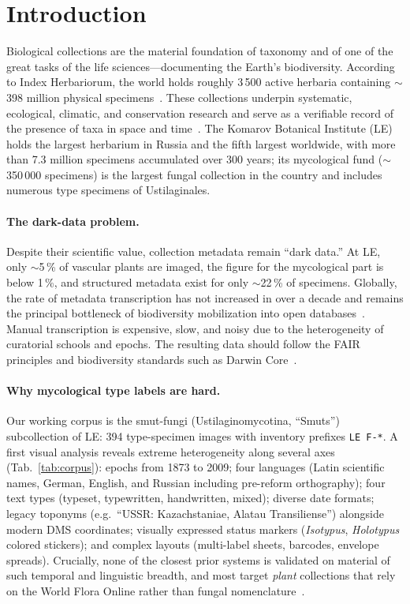 \section{Introduction}
\label{sec:intro}

Biological collections are the material foundation of taxonomy and of one of
the great tasks of the life sciences---documenting the Earth's biodiversity.
According to Index Herbariorum, the world holds roughly 3\,500 active herbaria
containing $\sim$398 million physical specimens~\cite{thiers2024ih}. These
collections underpin systematic, ecological, climatic, and conservation
research and serve as a verifiable record of the presence of taxa in space and
time~\cite{davis2023herbarium}. The Komarov Botanical Institute (LE) holds the
largest herbarium in Russia and the fifth largest worldwide, with more than
7.3 million specimens accumulated over 300 years; its mycological fund
($\sim$350\,000 specimens) is the largest fungal collection in the country and
includes numerous type specimens of Ustilaginales.

\paragraph{The dark-data problem.}
Despite their scientific value, collection metadata remain ``dark data.'' At
LE, only $\sim$5\,\% of vascular plants are imaged, the figure for the
mycological part is below 1\,\%, and structured metadata exist for only
$\sim$22\,\% of specimens. Globally, the rate of metadata transcription has not
increased in over a decade and remains the principal bottleneck of
biodiversity mobilization into open databases~\cite{owen2020nlp}. Manual
transcription is expensive, slow, and noisy due to the heterogeneity of
curatorial schools and epochs. The resulting data should follow the FAIR
principles and biodiversity standards such as Darwin
Core~\cite{wieczorek2012dwc}.

\paragraph{Why mycological type labels are hard.}
Our working corpus is the smut-fungi (Ustilaginomycotina, ``Smuts'')
subcollection of LE: 394 type-specimen images with inventory prefixes
\texttt{LE~F-*}. A first visual analysis reveals extreme heterogeneity along
several axes (Tab.~\ref{tab:corpus}): epochs from 1873 to 2009; four languages
(Latin scientific names, German, English, and Russian including pre-reform
orthography); four text types (typeset, typewritten, handwritten, mixed);
diverse date formats; legacy toponyms (e.g.\ ``USSR: Kazachstaniae, Alatau
Transiliense'') alongside modern DMS coordinates; visually expressed status
markers (\emph{Isotypus}, \emph{Holotypus} colored stickers); and complex
layouts (multi-label sheets, barcodes, envelope spreads). Crucially, none of
the closest prior systems is validated on material of such temporal and
linguistic breadth, and most target \emph{plant} collections that rely on the
World Flora Online rather than fungal
nomenclature~\cite{turnbull2025hespi,wen2025ocrllm}.

